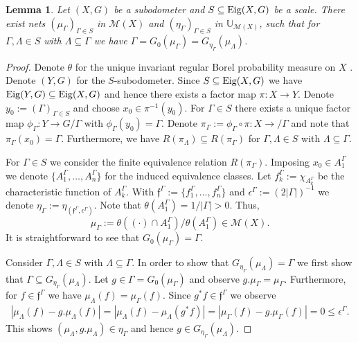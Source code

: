 \documentclass[12pt, reqno]{amsart}
\newtheorem{lemma}[theorem]{Lemma}
\theoremstyle{definition}
\theoremstyle{remark}
\numberwithin{equation}{section}
\theoremstyle{theorem}
\theoremstyle{remark}
\def\Eig{{\rm Eig}}
\begin{document}
\begin{lemma}
\label{lem:measureConstructionAndControl}
    Let $(X,G)$ be a subodometer and $S\subseteq \Eig(X,G)$ be a scale. 
    There exist nets $(\mu_\Gamma)_{\Gamma\in S}$ in $\mathcal{M}(X)$ and $(\eta_\Gamma)_{\Gamma\in S}$ in $\mathbb{U}_{\mathcal{M}(X)}$, such that for 
    $\Gamma,\Lambda\in S$ with $\Lambda\subseteq \Gamma$ we have 
    $\Gamma=G_0(\mu_\Gamma)=G_{\eta_\Gamma}(\mu_\Lambda)$. 
\end{lemma}
\begin{proof}
    Denote $\theta$ for the unique invariant regular Borel probability measure on $X$ \cite[Chapter~7]{auslander1988minimal}. 
    Denote $(Y,G)$ for the $S$-subodometer. Since $S\subseteq \Eig(X,G)$ we have $\Eig(Y,G)\subseteq \Eig(X,G)$ and hence there exists a factor map $\pi\colon X\to Y$. 
    Denote $y_0:=(\Gamma)_{\Gamma\in S}$ and choose $x_0\in \pi^{-1}(y_0)$. 
    For $\Gamma\in S$ there exists a unique factor map $\phi_\Gamma\colon Y\to G/\Gamma$ with $\phi_\Gamma(y_0)=\Gamma$. 
    Denote $\pi_\Gamma:=\phi_\Gamma\circ \pi\colon X\to/\Gamma$ and note that $\pi_\Gamma(x_0)=\Gamma$. 
    Furthermore, we have $R(\pi_\Lambda)\subseteq R(\pi_\Gamma)$ for $\Gamma,\Lambda\in S$ with $\Lambda\subseteq \Gamma$. 
    
    For $\Gamma\in S$ we consider the finite equivalence relation $R(\pi_\Gamma)$. Imposing $x_0\in A_1^\Gamma$ we denote $\{A_1^\Gamma,\dots, A_n^\Gamma\}$ for the induced equivalence classes.  
    Let $f_k^\Gamma:=\chi_{A_k^\Gamma}$ be the characteristic function of $A_k^\Gamma$. 
    With $\mathfrak{f}^\Gamma:=\{f_1^\Gamma,\dots, f_n^\Gamma\}$ and $\epsilon^\Gamma:=(2|\Gamma|)^{-1}$
    we denote $\eta_\Gamma:=\eta_{(\mathfrak{f}^\Gamma,\epsilon^\Gamma)}$. 
    Note that $\theta(A_1^\Gamma)=1/|\Gamma|>0$. 
    Thus, 
    \[\mu_\Gamma:=\theta((\cdot)\cap A_1^\Gamma)/\theta(A_1^\Gamma)\in \mathcal{M}(X).\]
    It is straightforward to see that $G_0(\mu_\Gamma)=\Gamma$. 

    Consider $\Gamma,\Lambda\in S$ with $\Lambda\subseteq \Gamma$.
    In order to show that $G_{\eta_\Gamma}(\mu_\Lambda)=\Gamma$ we first show that $\Gamma\subseteq G_{\eta_\Gamma}(\mu_\Lambda)$. 
    Let $g\in \Gamma=G_0(\mu_\Gamma)$ and observe $g.\mu_\Gamma=\mu_\Gamma$. 
    Furthermore, for $f\in \mathfrak{f}^\Gamma$ we have 
    $\mu_\Lambda(f)=\mu_\Gamma(f)$. Since $g^*f\in \mathfrak{f}^\Gamma$ we observe
    \begin{align*}
        |\mu_\Lambda(f)- g.\mu_\Lambda(f)|
        = |\mu_\Lambda(f)- \mu_\Lambda(g^*f)|
        = |\mu_\Gamma(f)- g.\mu_\Gamma(f)|
        = 0 \leq \epsilon^\Gamma. 
    \end{align*}
    This shows $(\mu_\Lambda,g.\mu_\Lambda)\in \eta_\Gamma$ and hence $g\in G_{\eta_\Gamma}(\mu_\Lambda)$. 


\end{proof}
\end{document}
